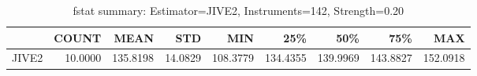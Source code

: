 \begin{table}[ht]
\centering
\caption{fstat summary: Estimator=JIVE2, Instruments=142, Strength=0.20}
\begin{tabular}{lrrrrrrrr}
\toprule
 & COUNT & MEAN & STD & MIN & 25\% & 50\% & 75\% & MAX \\
\midrule
JIVE2 & 10.0000 & 135.8198 & 14.0829 & 108.3779 & 134.4355 & 139.9969 & 143.8827 & 152.0918 \\
\bottomrule
\end{tabular}
\end{table}
